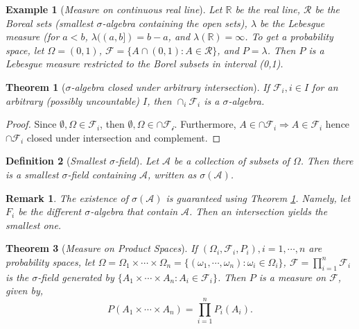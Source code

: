 \documentclass[10pt,a4paper]{article}
\newtheorem{theorem}{Theorem}[section]
\newtheorem{example}{Example}[section]
\newtheorem{definition}[theorem]{Definition}
\numberwithin{equation}{subsection}
\newtheorem{remark}{Remark}
\begin{document}
\begin{example}[\emph{Measure on continuous real line}]
Let $\mathbb{R}$ be the real line, $\mathcal{R}$ be
the Boreal sets (smallest $\sigma$-algebra containing
the open sets), $\lambda$ be the Lebesgue measure (for
$a<b$, $\lambda((a, b]) = b-a$, and $\lambda(\mathbb{R})
= \infty$. To get a probability space, let $\Omega = (0, 1)$,
$\mathcal{F} = \{A \cap (0,1): A \in \mathcal{R}\}$,
and $P = \lambda$. Then $P$ is a Lebesgue measure restricted
to the Borel subsets in interval (0,1). 
\end{example}

\begin{theorem}[\emph{$\sigma$-algebra closed under arbitrary intersection}] \label{1.thm.sigma.closed}
If $\mathcal{F}_i, i \in I$ for an arbitrary (possibly
uncountable) $I$, then $\cap_i \mathcal{F}_i$ is a 
$\sigma$-algebra. 

\end{theorem}

\begin{proof}
	Since $\emptyset, \Omega \in \mathcal{F}_i$, 
	then $\emptyset, \Omega \in \cap \mathcal{F_i}$.
	Furthermore, $A \in \cap \mathcal{F}_i \Rightarrow A \in \mathcal{F}_i$ hence $\cap \mathcal{F}_i$ closed
	under intersection and complement. 
\end{proof}

\begin{definition}[\emph{Smallest $\sigma$-field}]
	Let $\mathcal{A}$ be a collection of subsets of 
	$\Omega$. Then there is a smallest $\sigma$-field
	containing $\mathcal{A}$, written as $\sigma(\mathcal{A})$. 
\end{definition}

\begin{remark}
	The existence of $\sigma(\mathcal{A})$ is
	guaranteed using Theorem \ref{1.thm.sigma.closed}.
	Namely, let $F_i$ be the different $\sigma$-algebra
	that contain $\mathcal{A}$. Then an intersection
	yields the smallest one. 
\end{remark}

\begin{theorem}[\emph{Measure on Product Spaces}]
If $(\Omega_i, \mathcal{F}_i, P_i), i = 1, \cdots, n$ are probability spaces,
let $\Omega = \Omega_1 \times \cdots \times \Omega_n =
\{(\omega_1, \cdots, \omega_n): \omega_i \in \Omega_i\}$,
$\mathcal{F} = \prod_{i=1}^n \mathcal{F}_i$ is
the $\sigma$-field generated by $\{A_1 \times \cdots \times A_n: A_i \in \mathcal{F}_i\}$. Then $P$ is a measure on 
$\mathcal{F}$, given by, 
\[
	P(A_1 \times \cdots \times A_n) = \prod_{i=1}^n P_i(A_i). 
\]
\end{theorem}
\end{document}
